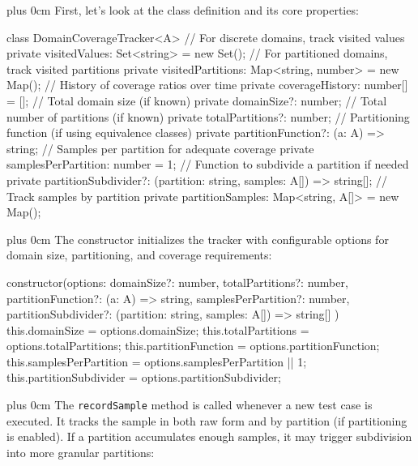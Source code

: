 \documentclass[conference]{IEEEtran}
\newcommand{\justifytext}{\leftskip=0pt \rightskip=0pt plus 0cm}
\begin{document}
\justifytext
First, let's look at the class definition and its core properties:

\begin{wrappedcode}
class DomainCoverageTracker<A> {
  // For discrete domains, track visited values
  private visitedValues: Set<string> = new Set();
  // For partitioned domains, track visited partitions
  private visitedPartitions: Map<string, number> = new Map();
  // History of coverage ratios over time
  private coverageHistory: number[] = [];
  // Total domain size (if known)
  private domainSize?: number;
  // Total number of partitions (if known)
  private totalPartitions?: number;
  // Partitioning function (if using equivalence classes)
  private partitionFunction?: (a: A) => string;
  // Samples per partition for adequate coverage
  private samplesPerPartition: number = 1;
  // Function to subdivide a partition if needed
  private partitionSubdivider?: (partition: string, samples: A[]) => string[];
  // Track samples by partition
  private partitionSamples: Map<string, A[]> = new Map();
}
\end{wrappedcode}

\justifytext
The constructor initializes the tracker with configurable options for domain size, partitioning, and coverage requirements:

\begin{wrappedcode}
  constructor(options: {
    domainSize?: number,
    totalPartitions?: number,
    partitionFunction?: (a: A) => string,
    samplesPerPartition?: number,
    partitionSubdivider?: (partition: string, samples: A[]) => string[]
  }) {
    this.domainSize = options.domainSize;
    this.totalPartitions = options.totalPartitions;
    this.partitionFunction = options.partitionFunction;
    this.samplesPerPartition = options.samplesPerPartition || 1;
    this.partitionSubdivider = options.partitionSubdivider;
  }
\end{wrappedcode}

\justifytext
The \texttt{recordSample} method is called whenever a new test case is executed. It tracks the sample in both raw form and by partition (if partitioning is enabled). If a partition accumulates enough samples, it may trigger subdivision into more granular partitions:
\end{document}
